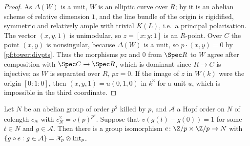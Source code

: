 \begin{proof}
As $\Delta(W)$ is a unit, $W$ is an elliptic curve over $R$; by
 it is an abelian scheme of relative dimension $1$, and
the line bundle of the origin is rigidified, symmetric and relatively ample with trivial $K(L)$, i.e.\ a principal polarisation.
The vector $(x,y,1)$ is unimodular, so $z=[x:y:1]$ is an $R$-point. Over $C$ the point $(x,y)$ is nonsingular, because $\Delta(W)$
is a unit, so $p\cdot(x,y)=0$ by \cref{pf:tower:divpts}. Thus the morphisms $pz$ and $0$ from $\Spec R$ to $W$ agree after
composition with $\Spec C\to\Spec R$, which is dominant since $R\to C$ is injective; as $W$ is separated over $R$, $pz=0$. If the
image of $z$ in $W(k)$ were the origin $[0:1:0]$, then $(x,y,1)=u(0,1,0)$ in $k^3$ for a unit $u$, which is impossible in the
third coordinate.
\end{proof}

\begin{lemma}\label{pf:tower:op2}
Let $N$ be an abelian group of order $p^2$ killed by $p$, and $\mathcal A$ a Hopf order on $N$ of colength $c_N$ with
$c_N^2=v(p)^{p^2}$. Suppose that $v(g(t)-g(0))=1$ for some $t\in N$ and $g\in\mathcal A$. Then there is a group isomorphism
$e\colon\Z/p\times\Z/p\to N$ with $\{g\circ e:g\in\mathcal A\}=\mathcal X_p\otimes\mathrm{Int}_p$.
\end{lemma}

